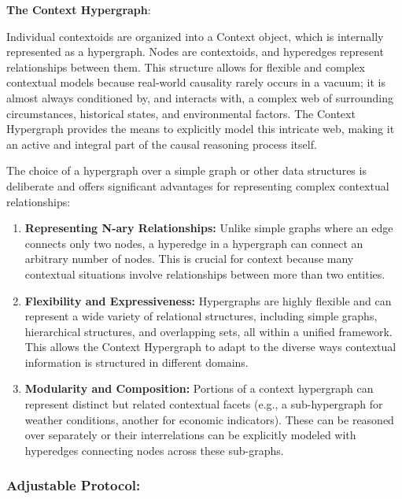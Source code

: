 \textbf{The Context Hypergraph}: 

Individual contextoids are organized into a Context object, which is internally represented as a hypergraph. Nodes are contextoids, and hyperedges represent relationships between them. This structure allows for flexible and complex contextual models because real-world causality rarely occurs in a vacuum; it is almost always conditioned by, and interacts with, a complex web of surrounding circumstances, historical states, and environmental factors. The Context Hypergraph provides the means to explicitly model this intricate web, making it an active and integral part of the causal reasoning process itself.

The choice of a hypergraph over a simple graph or other data structures is deliberate and offers significant advantages for representing complex contextual relationships:

\begin{enumerate}
    \item \textbf{Representing N-ary Relationships:} Unlike simple graphs where an edge connects only two nodes, a hyperedge in a hypergraph can connect an arbitrary number of nodes. This is crucial for context because many contextual situations involve relationships between more than two entities.
    \item \textbf{Flexibility and Expressiveness:} Hypergraphs are highly flexible and can represent a wide variety of relational structures, including simple graphs, hierarchical structures, and overlapping sets, all within a unified framework. This allows the Context Hypergraph to adapt to the diverse ways contextual information is structured in different domains.
    \item \textbf{Modularity and Composition:} Portions of a context hypergraph can represent distinct but related contextual facets (e.g., a sub-hypergraph for weather conditions, another for economic indicators). These can be reasoned over separately or their interrelations can be explicitly modeled with hyperedges connecting nodes across these sub-graphs.
\end{enumerate}

\newpage

\subsubsection{Adjustable Protocol:}

